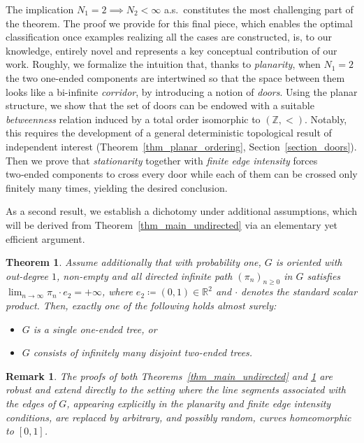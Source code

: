 \documentclass[a4paper, 11pt]{article} %
\theoremstyle{plain}
\newtheorem{remark}[theorem]{Remark}
\newtheorem{theoremI}{Theorem}
\newcommand{\R}{\mathbb{R}}
\newcommand{\Z}{\mathbb{Z}}
\newcommand{\1}{\mathds 1}
\numberwithin{equation}{section}
\begin{document}
The implication $N_1=2\implies N_2<\infty$ a.s.\ constitutes the most challenging part of the theorem. The proof we provide for this final piece, which enables the optimal classification once examples realizing all the cases are constructed, is, to our knowledge, entirely novel and represents a key conceptual contribution of our work. Roughly, we formalize the intuition that, thanks to \emph{planarity}, when $N_1=2$ the two one-ended components are intertwined so that the space between them looks like a bi-infinite \emph{corridor}, by introducing a notion of \emph{doors}. Using the planar structure, we show that the set of doors can be endowed with a suitable \emph{betweenness} relation induced by a total order isomorphic to $(\Z,<)$. Notably, this requires the development of a general deterministic topological result of independent interest (Theorem~\ref{thm_planar_ordering}, Section~\ref{section_doors}). Then we prove that \emph{stationarity} together with \emph{finite edge intensity} forces two‑ended components to cross every door while each of them can be crossed only finitely many times, yielding the desired conclusion.

As a second result, we establish a dichotomy under additional assumptions, which will be derived from Theorem~\ref{thm_main_undirected} via an elementary yet efficient argument.


\begin{theoremI}
    \label{thm_main_directed}
    Assume additionally that with probability one, $G$ is oriented with out-degree $1$, non-empty and all directed infinite path $(\pi_n)_{n\geq0}$ in $G$ satisfies $\lim_{n\to\infty}\pi_n\cdot e_2=+\infty$, where $e_2\coloneqq (0,1)\in\R^2$ and $\cdot$ denotes the standard scalar product. Then, exactly one of the following holds almost surely:
        \begin{itemize}
            \item $G$ is a single one-ended tree, or
            \item $G$ consists of infinitely many disjoint two-ended trees.
        \end{itemize}
\end{theoremI}


\begin{remark}
    \label{remark_extension_edge_curves}
    The proofs of both Theorems~\ref{thm_main_undirected} and \ref{thm_main_directed} are robust and extend directly to the setting where the line segments associated with the edges of $G$, appearing explicitly in the \emph{planarity} and \emph{finite edge intensity} conditions, are replaced by arbitrary, and possibly random, curves homeomorphic to $[0,1]$.
\end{remark}
\end{document}
